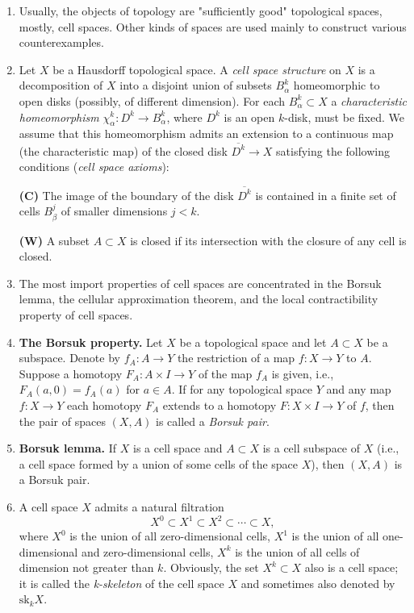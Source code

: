 \documentclass{article}
\newcommand{\sk}[2]{\text{sk}_{#1}#2}
\begin{document}
\begin{enumerate}
\item Usually, the objects of topology are "sufficiently good"
  topological spaces, mostly, cell spaces. Other kinds of spaces are
  used mainly to construct various counterexamples.

\item Let $X$ be a Hausdorff topological space. A \textit{cell space
    structure} on $X$ is a decomposition of $X$ into a disjoint union
  of subsets $B_\alpha^k$ homeomorphic to open disks (possibly, of
  different dimension). For each $B_\alpha^k \subset X$ a
  \textit{characteristic homeomorphism} $\chi_\alpha^k : D^k \to
  B_\alpha^k$, where $D^k$ is an open $k$-disk, must be fixed. We
  assume that this homeomorphism admits an extension to a continuous
  map (the characteristic map) of the closed disk $\overline{D^k} \to X$
  satisfying the following conditions (\textit{cell space axioms}):

\textbf{(C)} The image of the boundary of the disk $\overline{D^k}$ is
contained in a finite set of cells $B_\beta^j$ of smaller dimensions
$j < k$.

\textbf{(W)} A subset $A \subset X$ is closed if its intersection with
the closure of any cell is closed.

\item The most import properties of cell spaces are concentrated in
  the Borsuk lemma, the cellular approximation theorem, and the local
  contractibility property of cell spaces.

\item \textbf{The Borsuk property.} Let $X$ be a topological space and
  let $A \subset X$ be a subspace. Denote by $f_A : A \to Y$ the
  restriction of a map $f : X \to Y$ to $A$. Suppose a homotopy $F_A :
  A \times I \to Y$ of the map $f_A$ is given, i.e., $F_A(a,0) =
  f_A(a)$ for $a \in A$. If for any topological space $Y$ and any map
  $f : X \to Y$ each homotopy $F_A$ extends to a homotopy $F : X
  \times I \to Y$ of $f$, then the pair of spaces $(X,A)$ is called a
  \textit{Borsuk pair}.

\item \textbf{Borsuk lemma.} If $X$ is a cell space and $A \subset X$
  is a cell subspace of $X$ (i.e., a cell space formed by a union of
  some cells of the space $X$), then $(X,A)$ is a Borsuk pair.

\item A cell space $X$ admits a natural filtration
\[
X^0 \subset X^1 \subset X^2 \subset \cdots \subset X,
\]
where $X^0$ is the union of all zero-dimensional cells, $X^1$ is the
union of all one-dimensional and zero-dimensional cells, $X^k$ is the
union of all cells of dimension not greater than $k$. Obviously, the
set $X^k \subset X$ also is a cell space; it is called the
\textit{k-skeleton} of the cell space $X$ and sometimes also denoted
by $\sk{k}{X}$.


\end{enumerate}
\end{document}
